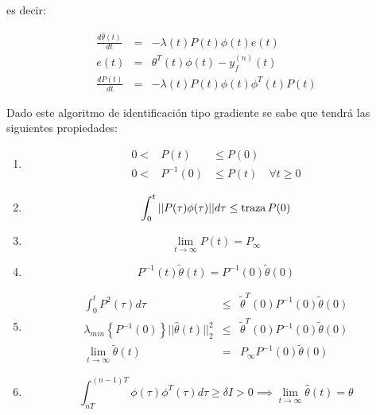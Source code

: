             es decir:

            \begin{eqnarray}
                \frac{d \hat{\theta}(t)}{dt} & = & - \lambda(t) P(t) \phi(t) e(t) \nonumber \\
                e(t) & = & \theta^T(t) \phi(t) - y_f^{(n)}(t) \nonumber \\
                \frac{d P(t)}{dt} & = & - \lambda(t) P(t) \phi(t) \phi^T(t) P(t)
            \end{eqnarray}

            Dado este algoritmo de identificación tipo gradiente se sabe que tendrá las siguientes propiedades:

            \begin{enumerate}
                \item
                    \begin{eqnarray*}
                        0 < & P(t) & \le P(0) \\
                        0 < & P^{-1}(0) & \le P(t) \quad \forall t \ge 0
                    \end{eqnarray*}

                \item
                    \begin{equation*}
                        \int_0^t || P(\tau) \phi(\tau) || d\tau \le \operatorname{traza}{P(0)}
                    \end{equation*}

                \item
                    \begin{equation*}
                        \lim_{t \to \infty} P(t) = P_{\infty}
                    \end{equation*}

                \item
                    \begin{equation*}
                        P^{-1}(t)\tilde{\theta}(t) = P^{-1}(0) \tilde{\theta}(0)
                    \end{equation*}

                \item
                    \begin{eqnarray*}
                        \int_0^tP^2(\tau) d\tau & \le & \tilde{\theta}^T(0)P^{-1}(0)\tilde{\theta}(0) \\
                        \lambda_{min} \left\{ P^{-1}(0) \right\} || \hat{\theta}(t) ||_2^2 & \le & \tilde{\theta}^T(0)P^{-1}(0) \tilde{\theta}(0) \\
                        \lim_{t \to \infty} \tilde{\theta}(t) & = & P_{\infty} P^{-1}(0) \tilde{\theta}(0)
                    \end{eqnarray*}

                \item
                    \begin{equation*}
                        \int_{nT}^{(n-1)T} \phi(\tau) \phi^T(\tau) d\tau \ge \delta I > 0 \implies \lim_{t \to \infty} \hat{\theta}(t) = \theta
                    \end{equation*}
            \end{enumerate}

